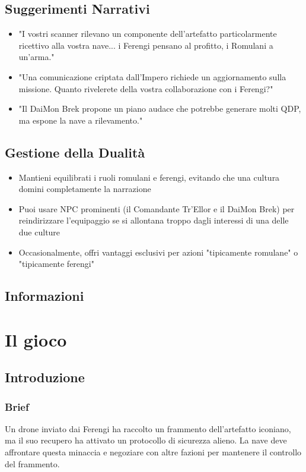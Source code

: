 \documentclass[letterpaper,twocolumn,openany,nodeprecatedcode]{dndbook}
\begin{document}
\subsection{Suggerimenti Narrativi}

\begin{itemize}
    \item "I vostri scanner rilevano un componente dell'artefatto particolarmente ricettivo alla vostra nave... i Ferengi pensano al profitto, i Romulani a un'arma."
    \item "Una comunicazione criptata dall'Impero richiede un aggiornamento sulla missione. Quanto rivelerete della vostra collaborazione con i Ferengi?"
    \item "Il DaiMon Brek propone un piano audace che potrebbe generare molti QDP, ma espone la nave a rilevamento."

\end{itemize}

\subsection{Gestione della Dualità}

\begin{itemize}
    \item Mantieni equilibrati i ruoli romulani e ferengi, evitando che una cultura domini completamente la narrazione
    \item Puoi usare NPC prominenti (il Comandante Tr'Ellor e il DaiMon Brek) per reindirizzare l'equipaggio se si allontana troppo dagli interessi di una delle due culture
    \item Occasionalmente, offri vantaggi esclusivi per azioni "tipicamente romulane" o "tipicamente ferengi"

\end{itemize}


\subsection {Informazioni}
\section{Il gioco}
\subsection{Introduzione}
\subsubsection{Brief}
Un drone inviato dai Ferengi ha raccolto un frammento dell'artefatto iconiano, ma il suo recupero ha attivato un protocollo di sicurezza alieno. La nave deve affrontare questa minaccia e negoziare con altre fazioni per mantenere il controllo del frammento.
\end{document}
